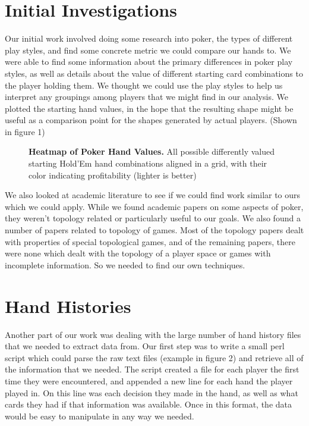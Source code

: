 \documentclass[11pt]{article}
\begin{document}
\section*{Initial Investigations}
Our initial work involved doing some research into poker, the types of different
play styles, and find some concrete metric we could compare our hands to.  We were
able to find some information about the primary differences in poker play styles,
as well as details about the value of different starting card combinations to the
player holding them. We thought we could use the play styles to help us interpret
any groupings among players that we might find in our analysis. We plotted the
starting hand values, in the hope that the resulting shape might be useful
as a comparison point for the shapes generated by actual players. (Shown in figure
1)

\begin{figure}[ht!]
  		\caption{\textbf{Heatmap of Poker Hand Values.} All possible differently 
  		valued starting Hold'Em hand combinations aligned in a grid, with 
  		their color indicating profitability (lighter is better)}
\end{figure}

We also
looked at academic literature to see if we could find work similar to ours which
we could apply. While we found academic papers on some aspects of poker, they
weren't topology related or particularly useful to our goals. We also found a
number of papers related to topology of games. Most of the topology papers dealt
with properties of special topological games, and of the remaining papers, there
were none which dealt with the topology of a player space or games with incomplete
information. So we needed to find our own techniques.

\section*{Hand Histories}
Another part of our work was dealing with the large number of hand history files
that we needed to extract data from. Our first step was to write a small perl
script which could parse the raw text files (example in figure 2) and retrieve
all of the information that we needed. The script created a file for each player
the first time they were encountered, and appended a new line for each hand the
player played in. On this line was each decision they made in the hand, as well
as what cards they had if that information was available. Once in this format,
the data would be easy to manipulate in any way we needed.
\end{document}
